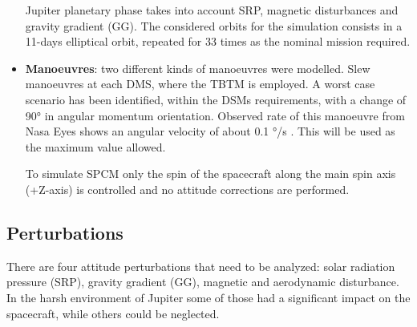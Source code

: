 \begin{itemize}
    Jupiter planetary phase takes into account SRP, magnetic disturbances and gravity gradient (GG). The considered orbits for the simulation consists in a 11-days elliptical orbit, repeated for 33 times as the nominal mission required. 

    \item \textbf{Manoeuvres}: two different kinds of manoeuvres were modelled. Slew manoeuvres at each DMS, where the TBTM is employed. A worst case scenario has been identified, within the DSMs requirements, with a change of 90° in angular momentum orientation. Observed rate of this manoeuvre from Nasa Eyes\cite{nasa_eyes} shows an angular velocity of about 0.1 °/s \cite{slides_michele}. This will be used as the maximum value allowed. 
    
    To simulate SPCM only the spin of the spacecraft along the main spin axis (+Z-axis) is controlled and no attitude corrections are performed.      


\end{itemize}

\subsection{Perturbations}
\label{subsec:perturbations}

There are four attitude perturbations that need to be analyzed: solar radiation pressure (SRP), gravity gradient (GG), magnetic and aerodynamic disturbance. In the harsh environment of Jupiter some of those had a significant impact on the spacecraft, while others could be neglected. 

